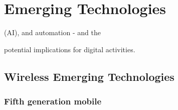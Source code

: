 \documentclass[a4paper,12pt]{book}
\begin{document}
\chapter{Emerging Technologies}

(AI), and automation - and the ​

potential implications for digital activities. ​

\clearpage
\section{Wireless Emerging Technologies}

\subsection{Fifth generation mobile}​
\end{document}
